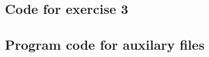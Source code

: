 \documentclass[a4paper]{article}
\begin{document}
\subsection{Code for exercise 3}


\subsection{Program code for auxilary files}\label{sec:aux}




\end{document}

